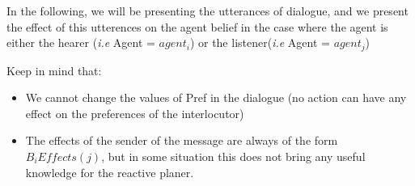 \documentclass{llncs}
\begin{document}
In the following, we will be presenting  the utterances of dialogue, and we present the effect of this utterences on the agent belief in the case where the agent is either the hearer (\textit{i.e} Agent = $agent_i$) or  the listener(\textit{i.e} Agent = $agent_j$)


Keep in mind that:
\begin{itemize}
	\item We cannot change the values of Pref in the dialogue (no action can have any effect on the preferences of the interlocutor)
	\item The effects of the sender of the message are always of the form $B_i Effects(j)$, but in some situation this does not bring any useful knowledge for the reactive planer.
\end{itemize}
\end{document}
